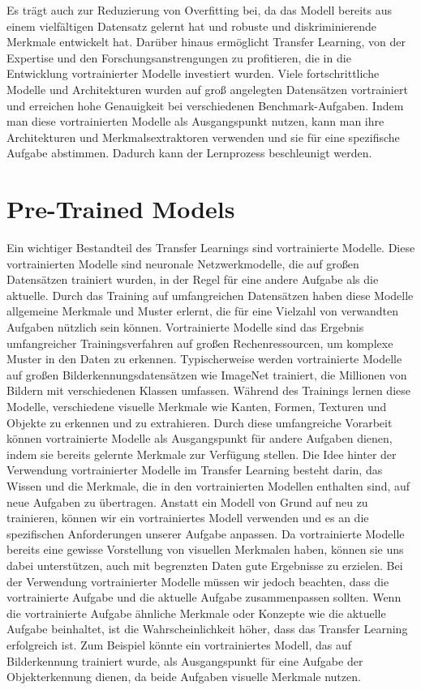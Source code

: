     Es trägt auch zur Reduzierung von Overfitting bei, da das Modell bereits aus einem vielfältigen Datensatz gelernt hat und robuste und diskriminierende Merkmale entwickelt hat.
    Darüber hinaus ermöglicht Transfer Learning, von der Expertise und den Forschungsanstrengungen zu profitieren, die in die Entwicklung vortrainierter Modelle investiert wurden. 
    Viele fortschrittliche Modelle und Architekturen wurden auf groß angelegten Datensätzen vortrainiert und erreichen hohe Genauigkeit bei verschiedenen Benchmark-Aufgaben. 
    Indem man diese vortrainierten Modelle als Ausgangspunkt nutzen, kann man ihre Architekturen und Merkmalsextraktoren verwenden und sie für eine spezifische Aufgabe abstimmen. Dadurch kann der Lernprozess beschleunigt werden.

\section{Pre-Trained Models}

    Ein wichtiger Bestandteil des Transfer Learnings sind vortrainierte Modelle. 
    Diese vortrainierten Modelle sind neuronale Netzwerkmodelle, die auf großen Datensätzen trainiert wurden, in der Regel für eine andere Aufgabe als die aktuelle. 
    Durch das Training auf umfangreichen Datensätzen haben diese Modelle allgemeine Merkmale und Muster erlernt, die für eine Vielzahl von verwandten Aufgaben nützlich sein können.
    Vortrainierte Modelle sind das Ergebnis umfangreicher Trainingsverfahren auf großen Rechenressourcen, um komplexe Muster in den Daten zu erkennen. 
    Typischerweise werden vortrainierte Modelle auf großen Bilderkennungsdatensätzen wie ImageNet trainiert, die Millionen von Bildern mit verschiedenen Klassen umfassen. 
    Während des Trainings lernen diese Modelle, verschiedene visuelle Merkmale wie Kanten, Formen, Texturen und Objekte zu erkennen und zu extrahieren. 
    Durch diese umfangreiche Vorarbeit können vortrainierte Modelle als Ausgangspunkt für andere Aufgaben dienen, indem sie bereits gelernte Merkmale zur Verfügung stellen.
    Die Idee hinter der Verwendung vortrainierter Modelle im Transfer Learning besteht darin, das Wissen und die Merkmale, die in den vortrainierten Modellen enthalten sind, auf neue Aufgaben zu übertragen. 
    Anstatt ein Modell von Grund auf neu zu trainieren, können wir ein vortrainiertes Modell verwenden und es an die spezifischen Anforderungen unserer Aufgabe anpassen. 
    Da vortrainierte Modelle bereits eine gewisse Vorstellung von visuellen Merkmalen haben, können sie uns dabei unterstützen, auch mit begrenzten Daten gute Ergebnisse zu erzielen.
    Bei der Verwendung vortrainierter Modelle müssen wir jedoch beachten, dass die vortrainierte Aufgabe und die aktuelle Aufgabe zusammenpassen sollten.
    Wenn die vortrainierte Aufgabe ähnliche Merkmale oder Konzepte wie die aktuelle Aufgabe beinhaltet, ist die Wahrscheinlichkeit höher, dass das Transfer Learning erfolgreich ist. 
    Zum Beispiel könnte ein vortrainiertes Modell, das auf Bilderkennung trainiert wurde, als Ausgangspunkt für eine Aufgabe der Objekterkennung dienen, da beide Aufgaben visuelle Merkmale nutzen.

